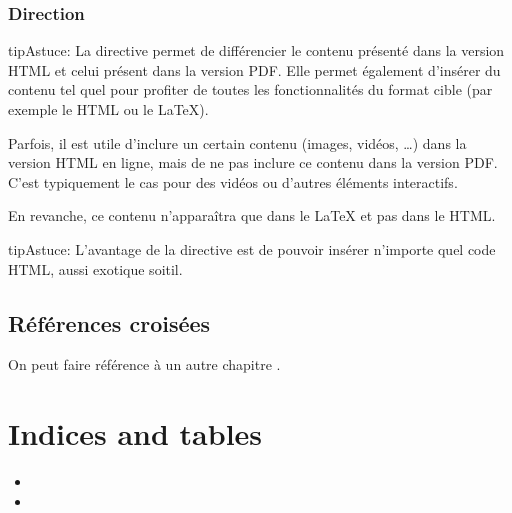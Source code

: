 \documentclass[a4,10pt,french]{sphinxmanual}
\begin{document}
\subsection{Direction }
\label{\detokenize{tutoriel-sphinx/advanced-features:direction-raw}}
\begin{sphinxadmonition}{tip}{Astuce:}
\sphinxAtStartPar
La directive  permet de différencier le contenu présenté dans la version HTML et celui présent dans la version PDF. Elle permet également d’insérer du contenu tel quel pour profiter de toutes les fonctionnalités du format cible (par exemple le HTML ou le LaTeX).
\end{sphinxadmonition}

\sphinxAtStartPar
Parfois, il est utile d’inclure un certain contenu (images, vidéos, …) dans la
version HTML en ligne, mais de ne pas inclure ce contenu dans la version PDF.
C’est typiquement le cas pour des vidéos ou d’autres éléments interactifs.



En revanche, ce contenu n'apparaîtra que dans le LaTeX et pas dans le HTML.


\begin{sphinxadmonition}{tip}{Astuce:}
\sphinxAtStartPar
L’avantage de la directive  est de pouvoir insérer n’importe quel code
HTML, aussi exotique soit\sphinxhyphen{}il.
\end{sphinxadmonition}


\section{Références croisées}
\label{\detokenize{tutoriel-sphinx/cross-references:references-croisees}}\label{\detokenize{tutoriel-sphinx/cross-references::doc}}
\sphinxAtStartPar
On peut faire référence à un autre chapitre .


\chapter{Indices and tables}
\label{\detokenize{index:indices-and-tables}}\begin{itemize}
\item {} 
\sphinxAtStartPar
{}

\item {} 
\sphinxAtStartPar
{}

\end{itemize}



\renewcommand{\indexname}{Index}
\printindex
\end{document}
